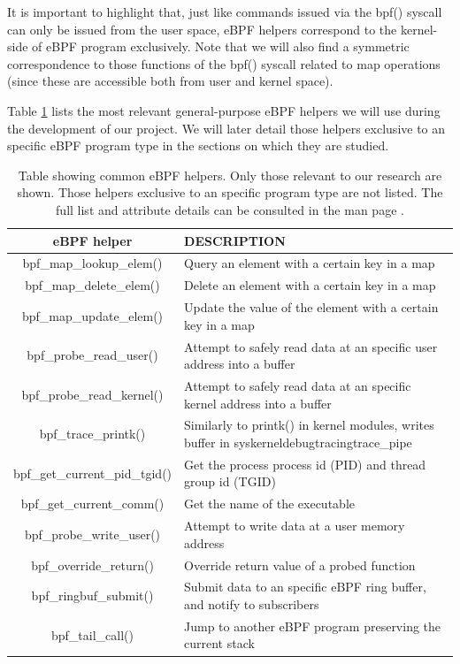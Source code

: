 \documentclass[12pt]{report} %
\begin{document}
It is important to highlight that, just like commands issued via the bpf() syscall can only be issued from the user space, eBPF helpers correspond to the kernel-side of eBPF program exclusively. Note that we will also find a symmetric correspondence to those functions of the bpf() syscall related to map operations (since these are accessible both from user and kernel space).

Table \ref{table:ebpf_helpers} lists the most relevant general-purpose eBPF helpers we will use during the development of our project. We will later detail those helpers exclusive to an specific eBPF program type in the sections on which they are studied.

\begin{table}[H]
\begin{tabular}{|c|>{\centering\arraybackslash}p{10cm}|}
\hline
eBPF helper & DESCRIPTION\\
\hline
\hline
bpf\_map\_lookup\_elem() & Query an element with a certain key in a map\\
\hline
bpf\_map\_delete\_elem() & Delete an element with a certain key in a map\\
\hline
bpf\_map\_update\_elem() & Update the value of the element with a certain key in a map\\
\hline
bpf\_probe\_read\_user() & Attempt to safely read data at an specific user address into a buffer\\
\hline
bpf\_probe\_read\_kernel() & Attempt to safely read data at an specific kernel address into a buffer\\
\hline
bpf\_trace\_printk() & Similarly to printk() in kernel modules, writes buffer in \/sys\/kernel\/debug\/tracing\/trace\_pipe\\
\hline
bpf\_get\_current\_pid\_tgid() & Get the process process id (PID) and thread group id (TGID)\\
\hline
bpf\_get\_current\_comm() & Get the name of the executable\\
\hline
bpf\_probe\_write\_user() & Attempt to write data at a user memory address\\
\hline
bpf\_override\_return() & Override return value of a probed function\\
\hline
bpf\_ringbuf\_submit() & Submit data to an specific eBPF ring buffer, and notify to subscribers\\
\hline
bpf\_tail\_call() & Jump to another eBPF program preserving the current stack\\
\hline
\end{tabular}
\caption{Table showing common eBPF helpers. Only those relevant to our research are shown. Those helpers exclusive to an specific program type are not listed. The full list and attribute details can be consulted in the man page \cite{ebpf_helpers}.}
\label{table:ebpf_helpers}
\end{table}
\end{document}
